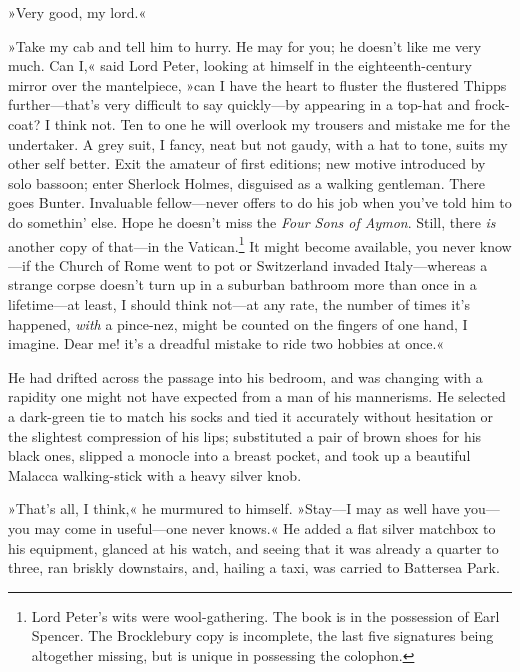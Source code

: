 »Very good, my lord.«

»Take my cab and tell him to hurry. He may for you; he doesn't like me very much. Can I,« said Lord Peter, looking at himself in the eighteenth-century mirror over the mantelpiece, »can I have the heart to fluster the flustered Thipps further\allowbreak---\allowbreak that's very difficult to say quickly\allowbreak---\allowbreak by appearing in a top-hat and frock-coat? I think not. Ten to one he will overlook my trousers and mistake me for the undertaker. A grey suit, I fancy, neat but not gaudy, with a hat to tone, suits my other self better. Exit the amateur of first editions; new motive introduced by solo bassoon; enter Sherlock Holmes, disguised as a walking gentleman. There goes Bunter. Invaluable fellow\allowbreak---\allowbreak never offers to do his job when you've told him to do somethin' else. Hope he doesn't miss the \textit{Four Sons of Aymon}. Still, there \textit{is} another copy of that\allowbreak---\allowbreak in the Vatican.\footnote{Lord Peter's wits were wool-gathering. The book is in the possession of Earl Spencer. The Brocklebury copy is incomplete, the last five signatures being altogether missing, but is unique in possessing the colophon.} It might become available, you never know\allowbreak---\allowbreak if the Church of Rome went to pot or Switzerland invaded Italy\allowbreak---\allowbreak whereas a strange corpse doesn't turn up in a suburban bathroom more than once in a lifetime\allowbreak---\allowbreak at least, I should think not\allowbreak---\allowbreak at any rate, the number of times it's happened, \textit{with} a pince-nez, might be counted on the fingers of one hand, I imagine. Dear me! it's a dreadful mistake to ride two hobbies at once.«

He had drifted across the passage into his bedroom, and was changing with a rapidity one might not have expected from a man of his mannerisms. He selected a dark-green tie to match his socks and tied it accurately without hesitation or the slightest compression of his lips; substituted a pair of brown shoes for his black ones, slipped a monocle into a breast pocket, and took up a beautiful Malacca walking-stick with a heavy silver knob.

»That's all, I think,« he murmured to himself. »Stay\allowbreak---\allowbreak I may as well have you\allowbreak---\allowbreak you may come in useful\allowbreak---\allowbreak one never knows.« He added a flat silver matchbox to his equipment, glanced at his watch, and seeing that it was already a quarter to three, ran briskly downstairs, and, hailing a taxi, was carried to Battersea Park.

